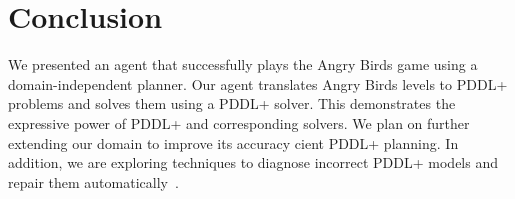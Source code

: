 \documentclass[letterpaper]{article} %
\begin{document}
\section{Conclusion}




We presented an agent that successfully plays the Angry Birds game  using a domain-independent planner.
Our agent translates Angry Birds levels to PDDL+ problems and solves them using a PDDL+ solver.
This demonstrates the expressive power of PDDL+ and corresponding solvers.
We plan on further extending our domain to improve its accuracy cient PDDL+ planning.
In addition, we are exploring techniques to diagnose incorrect PDDL+ models and repair them automatically~\cite{klenk2020model}.



\end{document}
